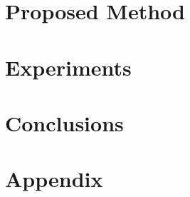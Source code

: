 \documentclass[12pt]{article}
\begin{document}
%	

\section{Proposed Method}
    \label{sec:proposed}
    


\section{Experiments}
    \label{sec:experiments}
    

\section{Conclusions}
   \label{sec:conclusions}
   





\newpage
\appendix
\section{Appendix}


\newpage
{}
\tableofcontents
\end{document}

